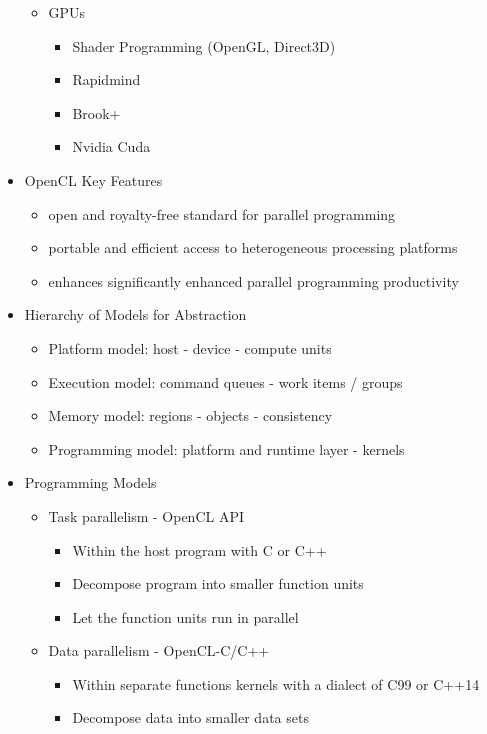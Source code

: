 \documentclass[paper=a4, fontsize=11pt]{scrartcl} %
\numberwithin{equation}{section} %
\numberwithin{figure}{section} %
\numberwithin{table}{section} %
\begin{document}
\begin{itemize}
\begin{itemize}
\begin{itemize}
    \end{itemize}
    \item GPUs
    \begin{itemize}
      \item Shader Programming (OpenGL, Direct3D)
      \item Rapidmind
      \item Brook+
      \item Nvidia Cuda
    \end{itemize}
  \end{itemize}
  \item OpenCL Key Features
  \begin{itemize}
    \item open and royalty-free standard for parallel programming
    \item portable and efficient access to heterogeneous processing platforms
    \item enhances significantly enhanced parallel programming productivity
  \end{itemize}
  \item Hierarchy of Models for Abstraction
  \begin{itemize}
    \item Platform model: host - device - compute units
    \item Execution model: command queues - work items / groups
    \item Memory model: regions - objects - consistency
    \item Programming model: platform and runtime layer - kernels
  \end{itemize}
  \item Programming Models
  \begin{itemize}
    \item Task parallelism - OpenCL API
    \begin{itemize}
      \item Within the host program with C or C++
      \item Decompose program into smaller function units
      \item Let the function units run in parallel
    \end{itemize}
    \item Data parallelism - OpenCL-C/C++
    \begin{itemize}
      \item Within separate functions kernels with a dialect of C99 or C++14
      \item Decompose data into smaller data sets

\end{itemize}
\end{itemize}
\end{itemize}
\end{document}
